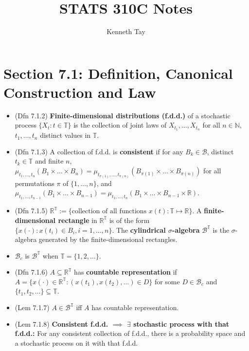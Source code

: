 \documentclass[twoside]{article}
\newcommand\bbN{\mathbb{N}}
\newcommand\bbR{\mathbb{R}}
\newcommand\bbT{\mathbb{T}}
\newcommand\calB{\mathcal{B}}
\newcommand\sg{\sigma}
\begin{document}
\title{STATS 310C Notes}
\author{Kenneth Tay}
\date{\vspace{-3ex}}
\maketitle

\section*{Section 7.1: Definition, Canonical Construction and Law}
\begin{itemize}
\item (Dfn 7.1.2) \textbf{Finite-dimensional distributions (f.d.d.)} of a stochastic process $\{ X_t: t \in \bbT \}$ is the collection of joint laws of $X_{t_1}, \dots, X_{t_n}$ for all $n \in \bbN$, $t_1, \dots, t_n$ distinct values in $\bbT$.

\item (Dfn 7.1.3) A collection of f.d.d. is \textbf{consistent} if for any $B_k \in \calB$, distinct $t_k \in \bbT$ and finite $n$, $\mu_{t_1, \dots, t_n}(B_1 \times \dots \times B_n) = \mu_{t_{\pi(1)}, \dots, t_{\pi(n)}}(B_{\pi(1)} \times \dots \times B_{\pi(n)})$ for all permutations $\pi$ of $\{1, \dots, n\}$, and $\mu_{t_1, \dots, t_{n-1}}(B_1 \times \dots \times B_{n-1}) = \mu_{t_1, \dots, t_n}(B_1 \times \dots \times B_{n-1} \times \bbR)$.

\item (Dfn 7.1.5) $\bbR^\bbT := \{ \text{collection of all functions } x(t): \bbT \mapsto \bbR \}$. A \textbf{finite-dimensional rectangle} in $\bbR^\bbT$ is of the form $\{ x(\cdot): x(t_i) \in B_i, i = 1, \dots, n \}$. The \textbf{cylindrical $\sg$-algebra} $\calB^\bbT$ is the $\sg$-algebra generated by the finite-dimensional rectangles.

\item $\calB_c$ is $\calB^\bbT$ when $\bbT = \{1, 2, \dots \}$.

\item (Dfn 7.1.6) $A \subseteq \bbR^\bbT$ has \textbf{countable representation} if $A = \{ x(\cdot) \in \bbR^\bbT: (x(t_1), x(t_2), \dots) \in D \}$ for some $D \in \calB_c$ and $\{ t_1, t_2, \dots \} \subseteq \bbT$.

\item (Lem 7.1.7) $A \in \calB^\bbT$ iff $A$ has countable representation.

\item (Lem 7.1.8) \textbf{Consistent f.d.d. $\implies$ $\exists$ stochastic process with that f.d.d.:} For any consistent collection of f.d.d., there is a probability space and a stochastic process on it with that f.d.d.


\end{itemize}
\end{document}
